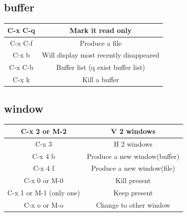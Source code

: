 \documentclass[a4paper,12pt,twoside]{book}
\begin{document}
\begin{CJK*}{UTF8}{song}
\subsection{buffer}
\begin{tabular}{|c|c|}
\hline C-x C-q & Mark it read only \\
\hline C-x C-f & Produce a file\\
\hline C-x b & Will display most recently disappeared\\
\hline C-x C-b &  Buffer list (q exist buffer list)\\
\hline C-x k & Kill a buffer\\
\hline
\end{tabular}

\subsection{window}
\begin{tabular}{|c|c|}
\hline C-x 2   or   M-2	& V 2 windows \\
\hline C-x 3   & H 2 windows\\
\hline C-x 4 b  & Produce a new window(buffer)\\
\hline C-x 4 f & Produce a new window(file)\\
\hline C-x 0   or    M-0 & Kill present\\
\hline C-x 1   or    M-1 (only one) & Keep present\\
\hline C-x o   or   M-o &  Change to other window\\
\hline
\end{tabular} \\

\end{CJK*}
\end{document}
